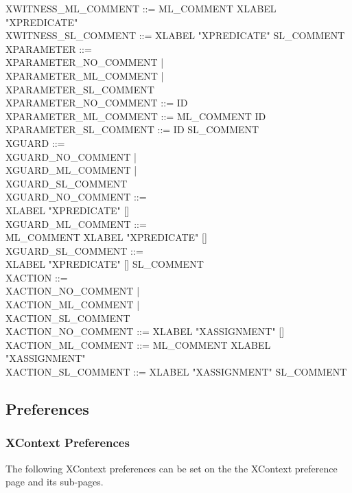 \begin{center}
\begin{Bcode}
    XWITNESS\_ML\_COMMENT ::= ML\_COMMENT XLABEL "XPREDICATE" \\
    XWITNESS\_SL\_COMMENT ::= XLABEL "XPREDICATE" SL\_COMMENT \\
    XPARAMETER ::= \\
    \Btab \Btab XPARAMETER\_NO\_COMMENT | \\
    \Btab \Btab XPARAMETER\_ML\_COMMENT | \\
    \Btab \Btab XPARAMETER\_SL\_COMMENT \\
    XPARAMETER\_NO\_COMMENT ::= ID \\
    XPARAMETER\_ML\_COMMENT ::= ML\_COMMENT ID \\
    XPARAMETER\_SL\_COMMENT ::= ID SL\_COMMENT \\
    XGUARD ::=\\
    \Btab \Btab XGUARD\_NO\_COMMENT |\\
    \Btab \Btab XGUARD\_ML\_COMMENT |\\
    \Btab \Btab XGUARD\_SL\_COMMENT\\
    XGUARD\_NO\_COMMENT ::= \\
    \Btab \Btab XLABEL "XPREDICATE" [\Btheorem]\\
    XGUARD\_ML\_COMMENT ::= \\
    \Btab \Btab ML\_COMMENT XLABEL "XPREDICATE" [\Btheorem]\\
    XGUARD\_SL\_COMMENT ::= \\
    \Btab \Btab XLABEL "XPREDICATE" [\Btheorem] SL\_COMMENT\\
    XACTION ::=\\
    \Btab \Btab XACTION\_NO\_COMMENT |\\
    \Btab \Btab XACTION\_ML\_COMMENT |\\
    \Btab \Btab XACTION\_SL\_COMMENT\\
    XACTION\_NO\_COMMENT ::= XLABEL "XASSIGNMENT" [\Btheorem]\\
    XACTION\_ML\_COMMENT ::= ML\_COMMENT XLABEL "XASSIGNMENT"\\
    XACTION\_SL\_COMMENT ::= XLABEL "XASSIGNMENT" SL\_COMMENT
  \end{Bcode}
\end{center}

\subsection{Preferences}
\label{sec:preferences}

\subsubsection{XContext Preferences}
\label{sec:xcontext-preferences}
The following XContext preferences can be set on the  the XContext preference page and its sub-pages.

